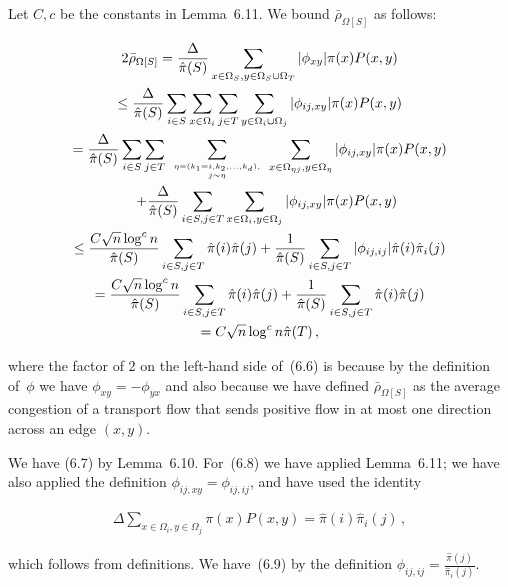 \documentclass[10pt,a4paper]{article}
\begin{document}
Let $C,c$ be the constants in Lemma 6.11. We bound $\bar{\rho}_{\Omega[S]}$ as follows:\par




\[\begin{gathered}
\displaystyle 2\bar{\rho}_{\Omega[S]} \displaystyle=\frac{\Delta}{\hat{\pi}(S)}\sum_{x\in\Omega_{S},y\in\Omega_{S}\cup\Omega_{T}}|\phi_{xy}|\pi(x)P(x,y) \\
\displaystyle\leq\frac{\Delta}{\hat{\pi}(S)}\sum_{i\in S}\sum_{x\in\Omega_{i}}\sum_{j\in T}\sum_{y\in\Omega_{i}\cup\Omega_{j}}|\phi_{ij,xy}|\pi(x)P(x,y) \\
\displaystyle=\frac{\Delta}{\hat{\pi}(S)}\sum_{i\in S}\sum_{j\in T}~\sum_{\eta=(k_{1}=i,k_{2},\dots,k_{d}),\atop j\sim\eta}~\sum_{x\in\Omega_{\eta j},y\in\Omega_{\eta}}|\phi_{ij,xy}|\pi(x)P(x,y) \\
\displaystyle\quad+\frac{\Delta}{\hat{\pi}(S)}\sum_{i\in S,j\in T}\sum_{x\in\Omega_{i},y\in\Omega_{j}}|\phi_{ij,xy}|\pi(x)P(x,y) \\
\displaystyle\leq\frac{C\sqrt{n}\log^{c}n}{\hat{\pi}(S)}\sum_{i\in S,j\in T}\hat{\pi}(i)\hat{\pi}(j)+\frac{1}{\hat{\pi}(S)}\sum_{i\in S,j\in T}|\phi_{ij,ij}|\hat{\pi}(i)\hat{\pi}_{i}(j) \\
\displaystyle=\frac{C\sqrt{n}\log^{c}n}{\hat{\pi}(S)}\sum_{i\in S,j\in T}\hat{\pi}(i)\hat{\pi}(j)+\frac{1}{\hat{\pi}(S)}\sum_{i\in S,j\in T}\hat{\pi}(i)\hat{\pi}(j) \\
\displaystyle=C\sqrt{n}\log^{c}n\hat{\pi}(T)\,,
\end{gathered}\]


where the factor of 2 on the left-hand side of (6.6) is because by the definition of $\phi$ we have $\phi_{xy}=-\phi_{yx}$ and also because we have defined $\bar{\rho}_{\Omega[S]}$ as the average congestion of a transport flow that sends positive flow in at most one direction across an edge $(x,y)$.\par




We have (6.7) by Lemma 6.10. For (6.8) we have applied Lemma 6.11; we have also applied the definition $\phi_{ij,xy}=\phi_{ij,ij}$, and have used the identity\par


\[\begin{gathered}
\Delta\sum_{x\in\Omega_{i},y\in\Omega_{j}}\pi(x)P(x,y)=\hat{\pi}(i)\hat{\pi}_{i}(j)\,,
\end{gathered}\]


which follows from definitions. We have (6.9) by the definition $\phi_{ij,ij}=\frac{\hat{\pi}(j)}{\hat{\pi}_{i}(j)}$.\par
\end{document}
